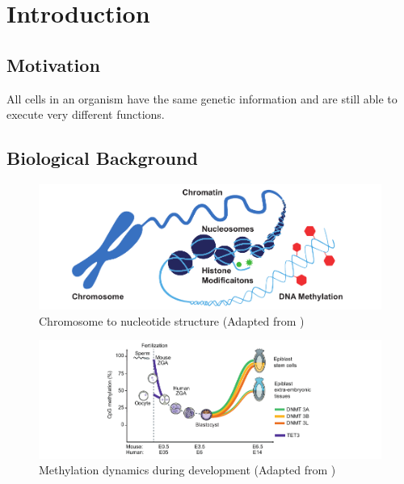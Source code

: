 \chapter{Introduction}
\label{cha:intro}



\section{Motivation}
\label{sec:intro:motivation}

All cells in an organism have the same genetic information and are still able to execute very different functions.

\section{Biological Background}
\label{sec:intro:bio}

\begin{figure}[h]
	\centering
	\includegraphics[width=1.0\textwidth]{figures/intro/chromatin.pdf}
	\captionsetup{format=plain}
	\caption[Structure]{Chromosome to nucleotide structure (Adapted from \cite{zymo2020})}
	\label{fig:intro:chromatin}
\end{figure}

\begin{figure}[h]
	\centering
	\includegraphics[width=1.0\textwidth]{figures/intro/methylation.pdf}
	\captionsetup{format=plain}
	\caption[DNA methylation dynamics]{Methylation dynamics during development (Adapted from \cite{Greenberg2019})}
	\label{fig:intro:methylation}
\end{figure}

